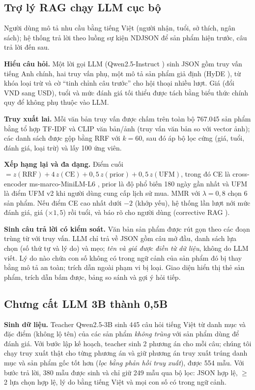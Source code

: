 \documentclass[conference,a4paper]{IEEEtran}
\begin{document}
\subsection{Trợ lý RAG chạy LLM cục bộ}\label{sec:rag}
Người dùng mô tả nhu cầu bằng tiếng Việt (người nhận, tuổi, sở thích, ngân sách); hệ thống trả lời theo luồng sự kiện NDJSON để sản phẩm hiện trước, câu trả lời đến sau.

\textbf{Hiểu câu hỏi.} Một lời gọi LLM (Qwen2.5-Instruct \cite{qwen2024}) sinh JSON gồm truy vấn tiếng Anh chính, hai truy vấn phụ, một mô tả sản phẩm giả định (HyDE \cite{gao2023hyde}), từ khóa loại trừ và cờ ``tinh chỉnh câu trước'' cho hội thoại nhiều lượt. Giá (đổi VND sang USD), tuổi và mức đánh giá tối thiểu được tách bằng biểu thức chính quy để không phụ thuộc vào LLM.

\textbf{Truy xuất lai.} Mỗi văn bản truy vấn được chấm trên toàn bộ 767.045 sản phẩm bằng tổ hợp TF-IDF và CLIP văn bản/ảnh (truy vấn văn bản so với vector ảnh); các danh sách được gộp bằng RRF \cite{cormack2009} với $k=60$, sau đó áp bộ lọc cứng (giá, tuổi, đánh giá, loại trừ) và lấy 100 ứng viên.

\textbf{Xếp hạng lại và đa dạng.} Điểm cuối $=z(\text{RRF})+4\,z(\text{CE})+0{,}5\,z(\text{prior})+0{,}5\,z(\text{UFM})$, trong đó CE là cross-encoder ms-marco-MiniLM-L6 \cite{nogueira2019,wang2020minilm}, prior là độ phổ biến 180 ngày gần nhất và UFM là điểm UFM v2 khi người dùng cung cấp lịch sử mua. MMR \cite{carbonell1998} với $\lambda=0{,}8$ chọn 6 sản phẩm. Nếu điểm CE cao nhất dưới $-2$ (khớp yếu), hệ thống lần lượt nới mức đánh giá, giá ($\times1{,}5$) rồi tuổi, và báo rõ cho người dùng (corrective RAG \cite{yan2024crag}).

\textbf{Sinh câu trả lời có kiểm soát.} Văn bản sản phẩm được rút gọn theo các đoạn trùng từ với truy vấn. LLM chỉ trả về JSON gồm câu mở đầu, danh sách lựa chọn (số thứ tự và lý do) và mẹo; \emph{tên và giá được điền từ dữ liệu}, không do LLM viết. Lý do nào chứa con số không có trong ngữ cảnh của sản phẩm đó bị thay bằng mô tả an toàn; trích dẫn ngoài phạm vi bị loại. Giao diện hiển thị thẻ sản phẩm, trích dẫn bấm được, bảng so sánh và gợi ý hỏi tiếp.

\subsection{Chưng cất LLM 3B thành 0,5B}\label{sec:distill}
\textbf{Sinh dữ liệu.} Teacher Qwen2.5-3B sinh 445 câu hỏi tiếng Việt từ danh mục và đặc điểm (không lộ tên) của các sản phẩm \emph{không trùng} với sản phẩm dùng để đánh giá. Với bước lập kế hoạch, teacher sinh 2 phương án cho mỗi câu; chúng tôi chạy truy xuất thật cho từng phương án và giữ phương án truy xuất trúng danh mục và sản phẩm gốc tốt hơn (\emph{lọc bằng phản hồi truy xuất}), được 554 mẫu. Với bước trả lời, 380 mẫu được sinh và chỉ giữ 249 mẫu qua bộ lọc: JSON hợp lệ, $\geq$2 lựa chọn hợp lệ, lý do bằng tiếng Việt và mọi con số có trong ngữ cảnh.
\end{document}
